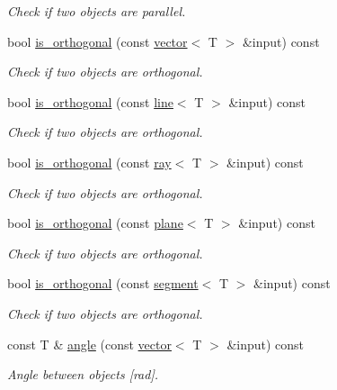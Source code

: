 \begin{DoxyCompactItemize}
\begin{DoxyCompactList}\small\item\em Check if two objects are parallel. \end{DoxyCompactList}\item 
bool \hyperlink{classddd_1_1line_a23122dec472048c57ee610ee76ddc6db}{is\+\_\+orthogonal} (const \hyperlink{classddd_1_1vector}{vector}$<$ T $>$ \&input) const
\begin{DoxyCompactList}\small\item\em Check if two objects are orthogonal. \end{DoxyCompactList}\item 
bool \hyperlink{classddd_1_1line_a31170f8f74362954dc35ae189ba64984}{is\+\_\+orthogonal} (const \hyperlink{classddd_1_1line}{line}$<$ T $>$ \&input) const
\begin{DoxyCompactList}\small\item\em Check if two objects are orthogonal. \end{DoxyCompactList}\item 
bool \hyperlink{classddd_1_1line_a3f836658151a55ad7f88dce40a975c3a}{is\+\_\+orthogonal} (const \hyperlink{classddd_1_1ray}{ray}$<$ T $>$ \&input) const
\begin{DoxyCompactList}\small\item\em Check if two objects are orthogonal. \end{DoxyCompactList}\item 
bool \hyperlink{classddd_1_1line_a52b6c5a1d0ca010c109d98e43ea43427}{is\+\_\+orthogonal} (const \hyperlink{classddd_1_1plane}{plane}$<$ T $>$ \&input) const
\begin{DoxyCompactList}\small\item\em Check if two objects are orthogonal. \end{DoxyCompactList}\item 
bool \hyperlink{classddd_1_1line_a2ddfad009ef1e253b854bfecaa7f759c}{is\+\_\+orthogonal} (const \hyperlink{classddd_1_1segment}{segment}$<$ T $>$ \&input) const
\begin{DoxyCompactList}\small\item\em Check if two objects are orthogonal. \end{DoxyCompactList}\item 
const T \& \hyperlink{classddd_1_1line_a467a7bb3964141ec5e84f4187cdf4099}{angle} (const \hyperlink{classddd_1_1vector}{vector}$<$ T $>$ \&input) const
\begin{DoxyCompactList}\small\item\em Angle between objects \mbox{[}rad\mbox{]}. \end{DoxyCompactList}\item 

\end{DoxyCompactItemize}
